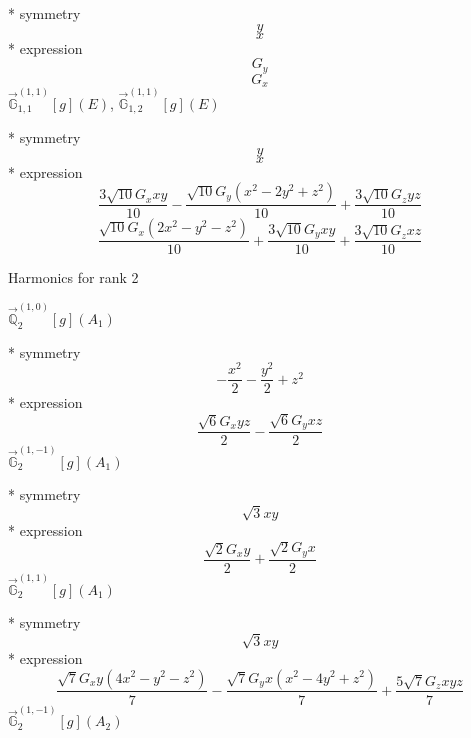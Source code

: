 \documentclass[fleqn,8pt]{jsarticle}
\begin{document}
\noindent\quad ** symmetry
\begin{dmath*}
y
\end{dmath*}
\begin{dmath*}
x
\end{dmath*}
\noindent\quad ** expression
\begin{dmath*}
G_{y}
\end{dmath*}
\begin{dmath*}
G_{x}
\end{dmath*}
\noindent\quad $\vec{\mathbb{G}}_{1,1}^{(1,1)}[g](E)$, $\vec{\mathbb{G}}_{1,2}^{(1,1)}[g](E)$

\noindent\quad ** symmetry
\begin{dmath*}
y
\end{dmath*}
\begin{dmath*}
x
\end{dmath*}
\noindent\quad ** expression
\begin{dmath*}
\frac{3 \sqrt{10} G_{x} x y}{10} - \frac{\sqrt{10} G_{y} \left(x^{2} - 2 y^{2} + z^{2}\right)}{10} + \frac{3 \sqrt{10} G_{z} y z}{10}
\end{dmath*}
\begin{dmath*}
\frac{\sqrt{10} G_{x} \left(2 x^{2} - y^{2} - z^{2}\right)}{10} + \frac{3 \sqrt{10} G_{y} x y}{10} + \frac{3 \sqrt{10} G_{z} x z}{10}
\end{dmath*}

\noindent * Harmonics for rank 2

\noindent\quad $\vec{\mathbb{Q}}_{2}^{(1,0)}[g](A_{1})$

\noindent\quad ** symmetry
\begin{dmath*}
- \frac{x^{2}}{2} - \frac{y^{2}}{2} + z^{2}
\end{dmath*}
\noindent\quad ** expression
\begin{dmath*}
\frac{\sqrt{6} G_{x} y z}{2} - \frac{\sqrt{6} G_{y} x z}{2}
\end{dmath*}
\noindent\quad $\vec{\mathbb{G}}_{2}^{(1,-1)}[g](A_{1})$

\noindent\quad ** symmetry
\begin{dmath*}
\sqrt{3} x y
\end{dmath*}
\noindent\quad ** expression
\begin{dmath*}
\frac{\sqrt{2} G_{x} y}{2} + \frac{\sqrt{2} G_{y} x}{2}
\end{dmath*}
\noindent\quad $\vec{\mathbb{G}}_{2}^{(1,1)}[g](A_{1})$

\noindent\quad ** symmetry
\begin{dmath*}
\sqrt{3} x y
\end{dmath*}
\noindent\quad ** expression
\begin{dmath*}
\frac{\sqrt{7} G_{x} y \left(4 x^{2} - y^{2} - z^{2}\right)}{7} - \frac{\sqrt{7} G_{y} x \left(x^{2} - 4 y^{2} + z^{2}\right)}{7} + \frac{5 \sqrt{7} G_{z} x y z}{7}
\end{dmath*}
\noindent\quad $\vec{\mathbb{G}}_{2}^{(1,-1)}[g](A_{2})$
\end{document}
